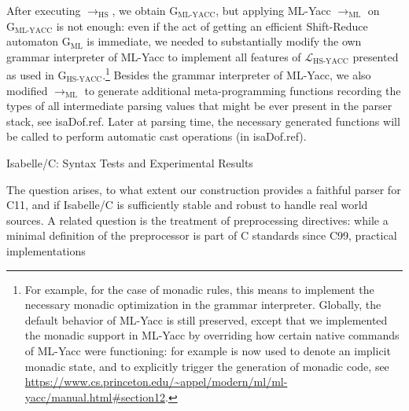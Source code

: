 \begin{isabellebody}
\begin{isamarkuptext}
After executing $\longrightarrow_{\text{HS}}$, we obtain $\text{G}_{\text{ML-YACC}}$, but applying
ML-Yacc $\longrightarrow_{\text{ML}}$ on $\text{G}_{\text{ML-YACC}}$ is not enough: even if the act
of getting an efficient Shift-Reduce automaton $\text{G}_{\text{ML}}$ is immediate, we needed to
substantially modify the own grammar interpreter of ML-Yacc to implement all features of
$\mathcal{L}_{\text{HS-YACC}}$ presented as used in $\text{G}_{\text{HS-YACC}}$.\footnote{For example, for the case of monadic rules, this means to implement the necessary monadic
  optimization in the grammar interpreter. Globally, the default behavior of ML-Yacc is still
  preserved, except that we implemented the monadic support in ML-Yacc by overriding how certain
  native commands of ML-Yacc were functioning: for example  is now
  used to denote an implicit monadic state, and  to explicitly
  trigger the generation of monadic code, see
  \url{https://www.cs.princeton.edu/~appel/modern/ml/ml-yacc/manual.html\#section12}.}
Besides the grammar interpreter of ML-Yacc, we also modified $\longrightarrow_{\text{ML}}$ to
generate additional meta-programming functions recording the types of all intermediate parsing
values that might be ever present in the parser stack, see \csname isaDof.ref. Later at parsing time, the necessary generated functions will be
called to perform automatic cast operations (in \csname isaDof.ref).%
\end{isamarkuptext}\isamarkuptrue%
%
\begin{isamarkupsection*}%
[label = {ctests},type = {scholarly_paper.technical}, args={label = {ctests},type = {scholarly_paper.technical}, Isa_COL.text_element.level = {}, Isa_COL.text_element.referentiable = {False}, Isa_COL.text_element.variants = {{STR ''outline'', STR ''document''}}, scholarly_paper.text_section.main_author = {}, scholarly_paper.text_section.fixme_list = {}, Isa_COL.text_element.level = {}, scholarly_paper.technical.definition_list = {}}]Isabelle/C: Syntax Tests and Experimental Results%
\end{isamarkupsection*}\isamarkuptrue%
%
\begin{isamarkuptext}%
The question arises, to what extent our construction provides a faithful parser for
C11, and if Isabelle/C is sufficiently stable and robust to handle real world sources. A related
question is the treatment of  preprocessing directives: while a
minimal definition of the preprocessor is part of C standards since C99, practical implementations

\end{isamarkuptext}
\end{isabellebody}
